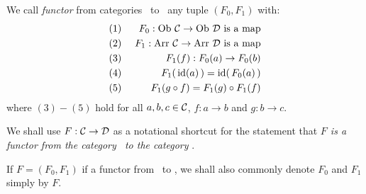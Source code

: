 \begin{defin}\label{Fun:def:functor}
    We call {\em functor} from categories \Cat\ to \Dat\ any tuple 
    $(F_{0},F_{1})$ with:
        \begin{eqnarray*}
            (1)&\ &F_{0}:\mbox{\rm Ob}\ \mbox{$\cal C$}\to\mbox{\rm Ob}\ \mbox{$\cal D$}\mbox{\ is a map}\\
            (2)&\ &F_{1}:\mbox{\rm Arr}\ \mbox{$\cal C$}\to\mbox{\rm Arr}\ \mbox{$\cal D$}\mbox{\ is a map}\\
            (3)&\ &F_{1}(f):F_{0}(a)\to F_{0}(b)\\
            (4)&\ &F_{1}(\,\mbox{\rm id}(a)\,)=\mbox{\rm id}(\,F_{0}(a)\,)\\
            (5)&\ &F_{1}(g\circ f)=F_{1}(g)\circ F_{1}(f)
    \end{eqnarray*}
    where $(3)-(5)$ hold for all $a,b,c\in\mbox{$\cal C$}$, $f:a\to b$ and $g:b\to c$.
\end{defin}
\noindent
\begin{notation}\label{Fun:notation:functor:arrow}
    We shall use $F:\mbox{$\cal C$}\to\mbox{$\cal D$}$ as a notational shortcut for the statement 
    that {\em $F$ is a functor from the category \Cat\ to the category \Dat}.
\end{notation}

\begin{notation}\label{Fun:notation:functor:F0:F1}
If $F=(F_{0},F_{1})$ if a functor from \Cat\ to \Dat, we shall also commonly 
denote $F_{0}$ and $F_{1}$ simply by $F$.
\end{notation}


